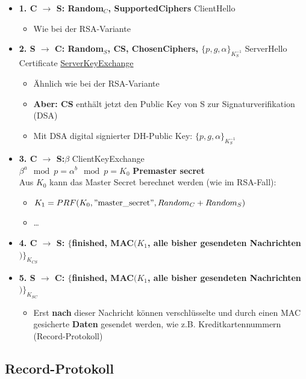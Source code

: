 \documentclass[openany]{book}
\begin{document}
\begin{itemize}
    \item \textbf{1. C $\rightarrow$ S: Random$_C$, Supported\textunderscore Ciphers} ClientHello
    \begin{itemize}
        \item Wie bei der RSA-Variante
    \end{itemize}
    \item \textbf{2. S $\rightarrow$ C: Random$_S$, CS, Chosen\textunderscore Ciphers, $\{ p,g,\alpha\}_{K_S^{-1}}$} ServerHello Certificate \underline{ServerKeyExchange}
    \begin{itemize}
        \item Ähnlich wie bei der RSA-Variante
        \item \textbf{Aber: CS} enthält jetzt den Public Key von S zur Signaturverifikation (DSA)
        \item Mit DSA digital signierter DH-Public Key: $\{ p,g,\alpha\}_{K_S^{-1}}$
    \end{itemize}
    \item \textbf{3. C $\rightarrow$ S:$\beta$} ClientKeyExchange \\ $\beta^a\mod p=\alpha^b\mod p=K_0$ \textbf{Premaster secret} \\ Aus $K_0$ kann das Master Secret berechnet werden (wie im RSA-Fall):
    \begin{itemize}
        \item $K_1=PRF(K_0,\text{''master\textunderscore secret''},Random_C+Random_S)$
        \item \dots
    \end{itemize}
    \item \textbf{4. C $\rightarrow$ S: $\{$finished, MAC$(K_1$, alle bisher gesendeten Nachrichten$)\}_{K_{CS}}$}
    \item \textbf{5. S $\rightarrow$ C: $\{$finished, MAC$(K_1$, alle bisher gesendeten Nachrichten$)\}_{K_{SC}}$}
    \begin{itemize}
        \item Erst \textbf{nach} dieser Nachricht können verschlüsselte und durch einen MAC gesicherte \textbf{Daten} gesendet werden, wie z.B. Kreditkartennummern (Record-Protokoll)
    \end{itemize}
\end{itemize}

\subsection{Record-Protokoll}
\end{document}
